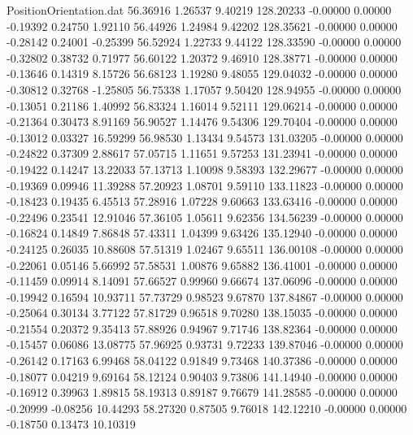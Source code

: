 \begin{filecontents}{PositionOrientation.dat}
  56.36916    1.26537    9.40219   128.20233   -0.00000    0.00000   -0.19392    0.24750    1.92110
  56.44926    1.24984    9.42202   128.35621   -0.00000    0.00000   -0.28142    0.24001   -0.25399
  56.52924    1.22733    9.44122   128.33590   -0.00000    0.00000   -0.32802    0.38732    0.71977
  56.60122    1.20372    9.46910   128.38771   -0.00000    0.00000   -0.13646    0.14319    8.15726
  56.68123    1.19280    9.48055   129.04032   -0.00000    0.00000   -0.30812    0.32768   -1.25805
  56.75338    1.17057    9.50420   128.94955   -0.00000    0.00000   -0.13051    0.21186    1.40992
  56.83324    1.16014    9.52111   129.06214   -0.00000    0.00000   -0.21364    0.30473    8.91169
  56.90527    1.14476    9.54306   129.70404   -0.00000    0.00000   -0.13012    0.03327   16.59299
  56.98530    1.13434    9.54573   131.03205   -0.00000    0.00000   -0.24822    0.37309    2.88617
  57.05715    1.11651    9.57253   131.23941   -0.00000    0.00000   -0.19422    0.14247   13.22033
  57.13713    1.10098    9.58393   132.29677   -0.00000    0.00000   -0.19369    0.09946   11.39288
  57.20923    1.08701    9.59110   133.11823   -0.00000    0.00000   -0.18423    0.19435    6.45513
  57.28916    1.07228    9.60663   133.63416   -0.00000    0.00000   -0.22496    0.23541   12.91046
  57.36105    1.05611    9.62356   134.56239   -0.00000    0.00000   -0.16824    0.14849    7.86848
  57.43311    1.04399    9.63426   135.12940   -0.00000    0.00000   -0.24125    0.26035   10.88608
  57.51319    1.02467    9.65511   136.00108   -0.00000    0.00000   -0.22061    0.05146    5.66992
  57.58531    1.00876    9.65882   136.41001   -0.00000    0.00000   -0.11459    0.09914    8.14091
  57.66527    0.99960    9.66674   137.06096   -0.00000    0.00000   -0.19942    0.16594   10.93711
  57.73729    0.98523    9.67870   137.84867   -0.00000    0.00000   -0.25064    0.30134    3.77122
  57.81729    0.96518    9.70280   138.15035   -0.00000    0.00000   -0.21554    0.20372    9.35413
  57.88926    0.94967    9.71746   138.82364   -0.00000    0.00000   -0.15457    0.06086   13.08775
  57.96925    0.93731    9.72233   139.87046   -0.00000    0.00000   -0.26142    0.17163    6.99468
  58.04122    0.91849    9.73468   140.37386   -0.00000    0.00000   -0.18077    0.04219    9.69164
  58.12124    0.90403    9.73806   141.14940   -0.00000    0.00000   -0.16912    0.39963    1.89815
  58.19313    0.89187    9.76679   141.28585   -0.00000    0.00000   -0.20999   -0.08256   10.44293
  58.27320    0.87505    9.76018   142.12210   -0.00000    0.00000   -0.18750    0.13473   10.10319

\end{filecontents}
